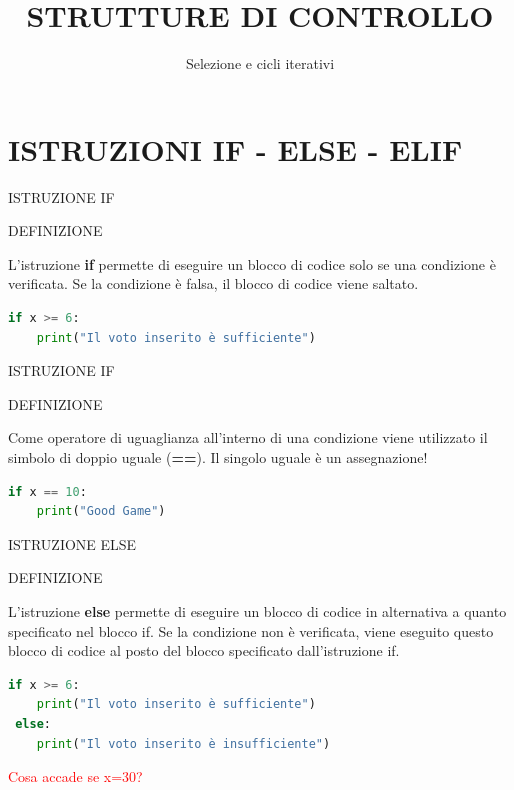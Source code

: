 \documentclass[aspectratio=1610]{beamer}
\title{STRUTTURE DI CONTROLLO}
\subtitle{Selezione e cicli iterativi}
\date{}
\institute{\textit{
        Fonti:
        \begin{itemize}
            \item[-] \href{https://docs.python.org/it/3.15/tutorial/controlflow.html}{Controllo del Flusso di Esecuzione - Documentazione Ufficiale Python}
        \end{itemize}
    }
}
\begin{document}
\begin{frame}
    \titlepage
\end{frame}

\section{ISTRUZIONI IF - ELSE - ELIF}

\begin{frame}[fragile]{ISTRUZIONE IF}
    \begin{alertblock}{DEFINIZIONE}
        \begin{minipage}{0.98\linewidth}
            \justifying
            L'istruzione \textbf{if} permette di eseguire un blocco di codice solo se una 
            condizione è verificata. Se la condizione è falsa, il blocco di codice viene saltato.\\
\begin{lstlisting}[language=Python]
 if x >= 6:
    print("Il voto inserito è sufficiente")
\end{lstlisting}
        \end{minipage}
    \end{alertblock}
\end{frame}

\begin{frame}[fragile]{ISTRUZIONE IF}
    \begin{alertblock}{DEFINIZIONE}
        \begin{minipage}{0.98\linewidth}
            \justifying
            Come operatore di uguaglianza all'interno di una condizione viene utilizzato il 
            simbolo di doppio uguale (\textbf{==}). Il singolo uguale è un assegnazione!\\
\begin{lstlisting}[language=Python]
 if x == 10:
    print("Good Game")
\end{lstlisting}
        \end{minipage}
    \end{alertblock}
\end{frame}

\begin{frame}[fragile]{ISTRUZIONE ELSE}
    \begin{alertblock}{DEFINIZIONE}
        \begin{minipage}{0.98\linewidth}
            \justifying
            L'istruzione \textbf{else} permette di eseguire un blocco di codice in alternativa 
            a quanto specificato nel blocco if. Se la condizione non è verificata, viene eseguito 
            questo blocco di codice al posto del blocco specificato dall'istruzione if.\\
\begin{lstlisting}[language=Python]
 if x >= 6:
    print("Il voto inserito è sufficiente")
 else:
    print("Il voto inserito è insufficiente")
\end{lstlisting}
    \pause
    \textcolor{red}{Cosa accade se x=30?}
        \end{minipage}
    \end{alertblock}
\end{frame}
\end{document}
